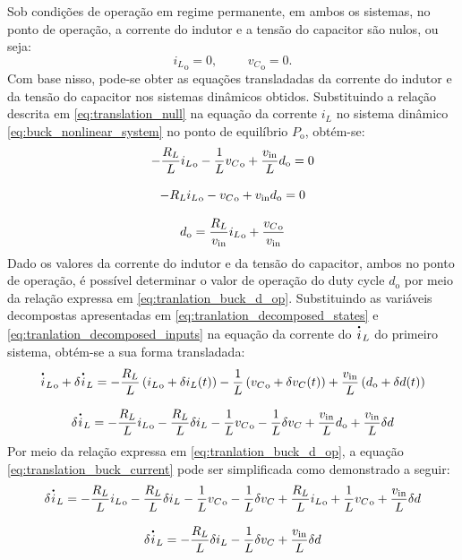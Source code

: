Sob condições de operação em regime permanente, em ambos os sistemas, no ponto de operação, a corrente do indutor e a tensão do capacitor são nulos, ou seja: \begin{equation} {i_L}_{\mathrm{o}} = 0, \hspace{1cm} {v_C}_{\mathrm{o}} = 0. \label{eq:translation_null}\end{equation} Com base nisso, pode-se obter as equações transladadas da corrente do indutor e da tensão do capacitor nos sistemas dinâmicos obtidos. Substituindo a relação descrita em \eqref{eq:translation_null} na equação da corrente $i_L$ no sistema dinâmico \eqref{eq:buck_nonlinear_system} no ponto de equilíbrio $P_{\mathrm{o}}$, obtém-se: \begin{gather}
  - \frac{R_L}{L} {i_L}_{\mathrm{o}} - \frac{1}{L} {v_C}_{\mathrm{o}} + \frac{v_{\mathrm{in}}}{L}  d_{\mathrm{o}} = 0  \notag \\[8pt]
  - R_L {i_L}_{\mathrm{o}} - {v_C}_{\mathrm{o}} + v_{\mathrm{in}}  d_{\mathrm{o}} = 0 \notag \\[8pt]
  d_{\mathrm{o}} = \frac{R_L}{v_{\mathrm{in}}} {i_L}_{\mathrm{o}} + \frac{{v_C}_{\mathrm{o}}}{v_{\mathrm{in}}} \label{eq:tranlation_buck_d_op}
\end{gather} Dado os valores da corrente do indutor e da tensão do capacitor, ambos no ponto de operação, é possível determinar o valor de operação do duty cycle $d_{\mathrm{o}}$ por meio da relação expressa em \eqref{eq:tranlation_buck_d_op}. Substituindo as variáveis decompostas apresentadas em \eqref{eq:tranlation_decomposed_states} e \eqref{eq:tranlation_decomposed_inputs} na equação da corrente do $\dt{i}_L$ do primeiro sistema, obtém-se a sua forma transladada: \begin{gather}
  {\dt{i}_L}_{\mathrm{o}} + \delta \dt{i}_L = - \frac{R_L}{L} \left({i_L}_{\mathrm{o}} + \delta i_L(t)\right) - \frac{1}{L} \left({v_C}_{\mathrm{o}} + \delta v_C(t)\right) + \frac{v_{\mathrm{in}}}{L} \left(d_{\mathrm{o}} + \delta d(t)\right) \notag\\[8pt]
  \delta \dt{i}_L = - \frac{R_L}{L} {i_L}_{\mathrm{o}} - \frac{R_L}{L} \delta i_L - \frac{1}{L} {v_C}_{\mathrm{o}} - \frac{1}{L} \delta v_C + \frac{v_{\mathrm{in}}}{L} d_{\mathrm{o}} + \frac{v_{\mathrm{in}}}{L} \delta d \label{eq:translation_buck_current}
\end{gather} Por meio da relação expressa em \eqref{eq:tranlation_buck_d_op}, a equação \eqref{eq:translation_buck_current} pode ser simplificada como demonstrado a seguir: \begin{gather}
  \delta \dt{i}_L = - \frac{R_L}{L} {i_L}_{\mathrm{o}} - \frac{R_L}{L} \delta i_L - \frac{1}{L} {v_C}_{\mathrm{o}} - \frac{1}{L} \delta v_C +  \frac{R_L}{L} {i_L}_{\mathrm{o}} + \frac{1}{L} {v_C}_{\mathrm{o}} + \frac{v_{\mathrm{in}}}{L} \delta d \notag \\[8pt]
  \delta \dt{i}_L = - \frac{R_L}{L} \delta i_L - \frac{1}{L} \delta v_C  + \frac{v_{\mathrm{in}}}{L} \delta d \label{eq:translation_buck_current_simplified}
\end{gather}

